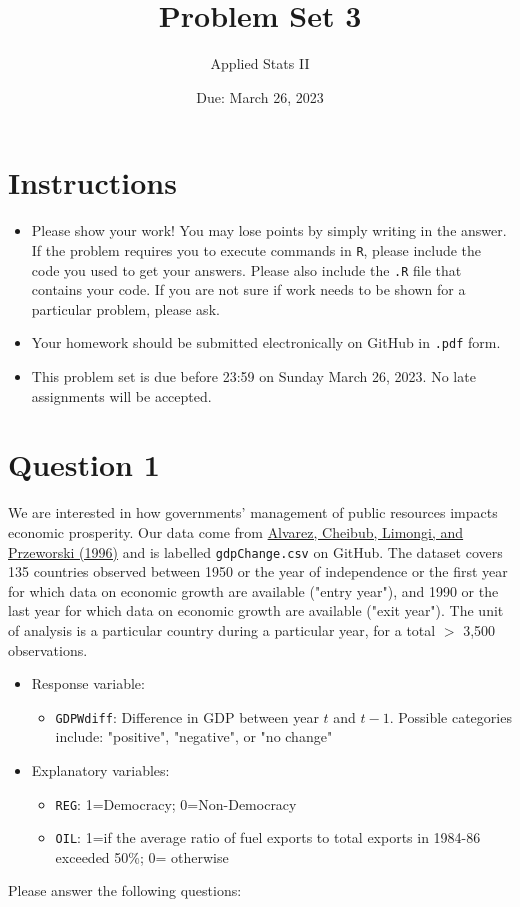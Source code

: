 \documentclass[12pt,letterpaper]{article}
\title{Problem Set 3}
\date{Due: March 26, 2023}
\author{Applied Stats II}
\begin{document}
	\maketitle
	\section*{Instructions}
	\begin{itemize}
		\item Please show your work! You may lose points by simply writing in the answer. If the problem requires you to execute commands in \texttt{R}, please include the code you used to get your answers. Please also include the \texttt{.R} file that contains your code. If you are not sure if work needs to be shown for a particular problem, please ask.
		\item Your homework should be submitted electronically on GitHub in \texttt{.pdf} form.
		\item This problem set is due before 23:59 on Sunday March 26, 2023. No late assignments will be accepted.
	\end{itemize}
	
	\vspace{.25cm}
	\section*{Question 1}
	\vspace{.25cm}
	\noindent We are interested in how governments' management of public resources impacts economic prosperity. Our data come from \href{https://www.researchgate.net/profile/Adam_Przeworski/publication/240357392_Classifying_Political_Regimes/links/0deec532194849aefa000000/Classifying-Political-Regimes.pdf}{Alvarez, Cheibub, Limongi, and Przeworski (1996)} and is labelled \texttt{gdpChange.csv} on GitHub. The dataset covers 135 countries observed between 1950 or the year of independence or the first year for which data on economic growth are available ("entry year"), and 1990 or the last year for which data on economic growth are available ("exit year"). The unit of analysis is a particular country during a particular year, for a total $>$ 3,500 observations. 
	
	\begin{itemize}
		\item
		Response variable: 
		\begin{itemize}
			\item \texttt{GDPWdiff}: Difference in GDP between year $t$ and $t-1$. Possible categories include: "positive", "negative", or "no change"
		\end{itemize}
		\item
		Explanatory variables: 
		\begin{itemize}
			\item
			\texttt{REG}: 1=Democracy; 0=Non-Democracy
			\item
			\texttt{OIL}: 1=if the average ratio of fuel exports to total exports in 1984-86 exceeded 50\%; 0= otherwise
		\end{itemize}
		
	\end{itemize}
	\newpage
	\noindent Please answer the following questions:
	
\end{document}
